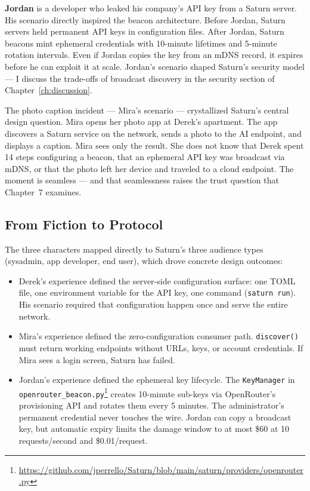 \textbf{Jordan} is a developer who leaked his company's API key from a Saturn server. His scenario directly inspired the beacon architecture. Before Jordan, Saturn servers held permanent API keys in configuration files. After Jordan, Saturn beacons mint ephemeral credentials with 10-minute lifetimes and 5-minute rotation intervals. Even if Jordan copies the key from an mDNS record, it expires before he can exploit it at scale. Jordan's scenario shaped Saturn's security model --- I discuss the trade-offs of broadcast discovery in the security section of Chapter~\ref{ch:discussion}.

The photo caption incident --- Mira's scenario --- crystallized Saturn's central design question. Mira opens her photo app at Derek's apartment. The app discovers a Saturn service on the network, sends a photo to the AI endpoint, and displays a caption. Mira sees only the result. She does not know that Derek spent 14 steps configuring a beacon, that an ephemeral API key was broadcast via mDNS, or that the photo left her device and traveled to a cloud endpoint. The moment is seamless --- and that seamlessness raises the trust question that Chapter~7 examines.

\subsection{From Fiction to Protocol}

The three characters mapped directly to Saturn's three audience types (sysadmin, app developer, end user), which drove concrete design outcomes:

\begin{itemize}
\item Derek's experience defined the server-side configuration surface: one TOML file, one environment variable for the API key, one command (\texttt{saturn run}). His scenario required that configuration happen once and serve the entire network.
\item Mira's experience defined the zero-configuration consumer path. \texttt{discover()} must return working endpoints without URLs, keys, or account credentials. If Mira sees a login screen, Saturn has failed.
\item Jordan's experience defined the ephemeral key lifecycle. The \texttt{KeyManager} in \texttt{openrouter\_beacon.py}\footnote{\url{https://github.com/jperrello/Saturn/blob/main/saturn/providers/openrouter.py}} creates 10-minute sub-keys via OpenRouter's provisioning API and rotates them every 5 minutes. The administrator's permanent credential never touches the wire. Jordan can copy a broadcast key, but automatic expiry limits the damage window to at most \$60 at 10 requests/second and \$0.01/request.
\end{itemize}

